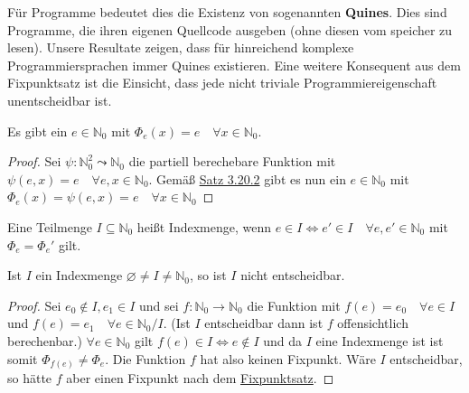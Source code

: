     Für Programme bedeutet dies die Existenz von sogenannten \textbf{Quines}. Dies sind Programme, die ihren eigenen Quellcode ausgeben (ohne diesen vom speicher zu lesen). Unsere Resultate zeigen, dass für hinreichend komplexe Programmiersprachen immer Quines existieren. Eine weitere Konsequent aus dem Fixpunktsatz ist die Einsicht, dass jede nicht triviale Programmiereigenschaft unentscheidbar ist.

    Es gibt ein \(e \in \mathbb{N}_0\) mit \(\Phi_e(x) = e \quad \forall x \in \mathbb{N}_0\).
    \begin{proof}
      Sei \(\psi : \mathbb{N}_0^2 \leadsto \mathbb{N}_0\) die partiell berechebare Funktion mit \(\psi(e, x) = e \quad \forall e, x \in \mathbb{N}_0\). Gemäß \hyperref[subsubsec:3.20.2]{Satz 3.20.2} gibt es nun ein \(e \in \mathbb{N}_0\) mit \(\Phi_e (x) = \psi (e,x) = e \quad \forall x \in \mathbb{N}_0\)
    \end{proof}

    Eine Teilmenge \(I \subseteq \mathbb{N}_0\) heißt Indexmenge, wenn \(e \in I \Leftrightarrow e' \in I \quad \forall e, e' \in \mathbb{N}_0\) mit \(\Phi_e = \Phi_e'\) gilt.

    Ist \(I\) ein Indexmenge \(\varnothing \not = I \not = \mathbb{N}_0\), so ist \(I\) nicht entscheidbar.
    \begin{proof}
      Sei \(e_0 \not \in I, e_1 \in I\) und sei \(f: \mathbb{N}_0 \to \mathbb{N}_0\) die Funktion mit \(f(e) = e_0 \quad \forall e \in I\) und \(f(e) = e_1 \quad \forall e \in \mathbb{N}_0 / I\). (Ist \(I\) entscheidbar dann ist \(f\) offensichtlich berechenbar.) \(\forall e \in \mathbb{N}_0\) gilt \(f(e) \in I \Leftrightarrow e \not \in I\) und da \(I\) eine Indexmenge ist ist somit \(\Phi_{f(e)} \not = \Phi_e\). Die Funktion \(f\) hat also keinen Fixpunkt. Wäre \(I\) entscheidbar, so hätte \(f\) aber einen Fixpunkt nach dem \hyperref[subsubsec:3.20.1]{Fixpunktsatz}.
    \end{proof}